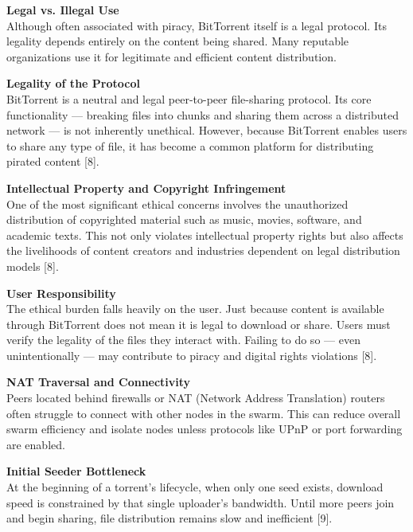 \documentclass[landscape]{a0poster}
\begin{document}
\begin{multicols*}{3}
\vspace{1em}

\textbf{Legal vs. Illegal Use} \\
Although often associated with piracy, BitTorrent itself is a  legal protocol. Its legality depends entirely on the  content being shared. Many reputable organizations use it for legitimate and efficient content distribution.

\textbf{Legality of the Protocol} \\
BitTorrent is a neutral and legal peer-to-peer file-sharing protocol. Its core functionality — breaking files into chunks and sharing them across a distributed network — is not inherently unethical. However, because BitTorrent enables users to share any type of file, it has become a common platform for distributing pirated content [8].

\vspace{1em}

\textbf{Intellectual Property and Copyright Infringement} \\
One of the most significant ethical concerns involves the unauthorized distribution of copyrighted material such as music, movies, software, and academic texts. This not only violates intellectual property rights but also affects the livelihoods of content creators and industries dependent on legal distribution models [8].

\vspace{1em}

\textbf{User Responsibility} \\
The ethical burden falls heavily on the user. Just because content is available through BitTorrent does not mean it is legal to download or share. Users must verify the legality of the files they interact with. Failing to do so — even unintentionally — may contribute to piracy and digital rights violations [8].



\textbf{ NAT Traversal and Connectivity} \\
Peers located behind firewalls or NAT (Network Address  Translation) routers often struggle to  connect with other nodes in the swarm. This can reduce overall swarm efficiency and isolate nodes unless protocols like UPnP or port forwarding are enabled.

\vspace{1em}

\textbf{Initial Seeder Bottleneck} \\
At the beginning of a torrent’s lifecycle, when  only one seed exists, download speed is constrained by that single uploader’s bandwidth. Until more peers join and begin sharing, file distribution  remains slow and inefficient [9].


\end{multicols*}
\end{document}
